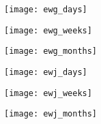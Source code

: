 \clearpage
\begin{figure}
\centerline{\texttt{[image: ewg\_days]}}
\caption{
\label{fig:Price_ewg_d}
}
\end{figure}

\begin{figure} 
\centerline{\texttt{[image: ewg\_weeks]}}
\caption{
\label{fig:Price_ewg_w}
}
\end{figure} 

\begin{figure} 
\centerline{\texttt{[image: ewg\_months]}}
\caption{
\label{fig:Price_ewg_m}
}
\end{figure} 

\clearpage
\begin{figure}
\centerline{\texttt{[image: ewj\_days]}}
\caption{
\label{fig:Price_ewj_d}
}
\end{figure}

\begin{figure} 
\centerline{\texttt{[image: ewj\_weeks]}}
\caption{
\label{fig:Price_ewj_w}
}
\end{figure} 

\begin{figure} 
\centerline{\texttt{[image: ewj\_months]}}
\caption{
\label{fig:Price_ewj_m}
}
\end{figure} 

\clearpage
